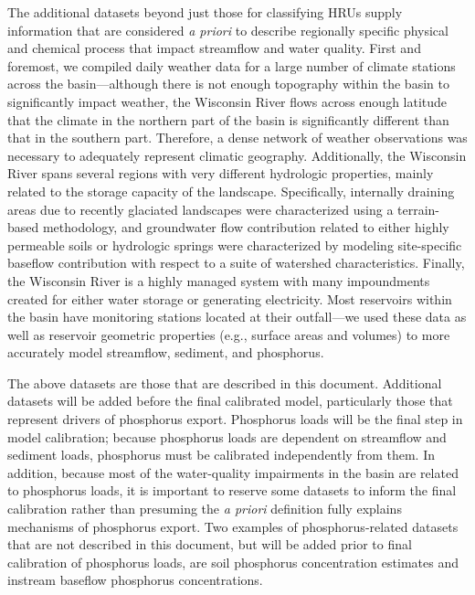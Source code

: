 The additional datasets beyond just those for classifying HRUs supply information that are considered \textit{a priori} to describe regionally specific physical and chemical process that impact streamflow and water quality. First and foremost, we compiled daily weather data for a large number of climate stations across the basin---although there is not enough topography within the basin to significantly impact weather, the Wisconsin River flows across enough latitude that the climate in the northern part of the basin is significantly different than that in the southern part. Therefore, a dense network of weather observations was necessary to adequately represent climatic geography. Additionally, the Wisconsin River spans several regions with very different hydrologic properties, mainly related to the storage capacity of the landscape. Specifically, internally draining areas due to recently glaciated landscapes were characterized using a terrain-based methodology, and groundwater flow contribution related to either highly permeable soils or hydrologic springs were characterized by modeling site-specific baseflow contribution with respect to a suite of watershed characteristics. Finally, the Wisconsin River is a highly managed system with many impoundments created for either water storage or generating electricity. Most reservoirs within the basin have monitoring stations located at their outfall---we used these data as well as reservoir geometric properties (e.g., surface areas and volumes) to more accurately model streamflow, sediment, and phosphorus.

The above datasets are those that are described in this document. Additional datasets will be added before the final calibrated model, particularly those that represent drivers of phosphorus export. Phosphorus loads will be the final step in model calibration; because phosphorus loads are dependent on streamflow and sediment loads, phosphorus must be calibrated independently from them. In addition, because most of the water-quality impairments in the basin are related to phosphorus loads, it is important to reserve some datasets to inform the final calibration rather than presuming the \textit{a priori} definition fully explains mechanisms of phosphorus export. Two examples of phosphorus-related datasets that are not described in this document, but will be added prior to final calibration of phosphorus loads, are soil phosphorus concentration estimates and instream baseflow phosphorus concentrations.

